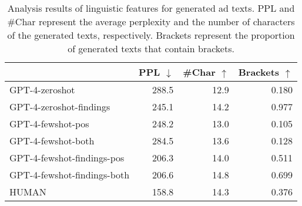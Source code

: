 \begin{table}[t]
\centering
{\small
\begin{tabular}{@{}l@{ }r@{\ \ \ }r@{\ \ \ }r@{}}
\toprule
& \textbf{PPL $\downarrow$} & \textbf{\#Char $\uparrow$} & \textbf{Brackets $\uparrow$} \\ \midrule
\textrm{GPT-4-zeroshot}              & 288.5 & 12.9  & 0.180 \\
\textrm{GPT-4-zeroshot-findings}     & 245.1 & 14.2  & 0.977 \\
\textrm{GPT-4-fewshot-pos}           & 248.2 & 13.0  & 0.105 \\
\textrm{GPT-4-fewshot-both}          & 284.5 & 13.6  & 0.128 \\
\textrm{GPT-4-fewshot-findings-pos}  & 206.3 & 14.0  & 0.511 \\
\textrm{GPT-4-fewshot-findings-both} & 206.6 & 14.8  & 0.699 \\ \midrule
\textrm{HUMAN}                       & 158.8 & 14.3  & 0.376 \\ \bottomrule
\end{tabular}}
\caption{Analysis results of linguistic features for generated ad texts. PPL and \#Char represent the average perplexity and the number of characters of the generated texts, respectively. Brackets represent the proportion of generated texts that contain brackets.}\label{tab:atg_analysis}
\end{table}